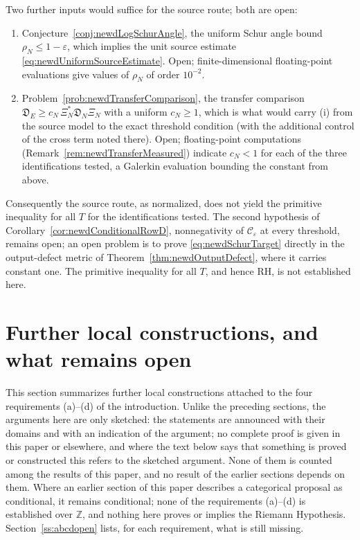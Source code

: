 \documentclass[11pt]{amsart}
\theoremstyle{definition}
\theoremstyle{remark}
\newcommand{\Z}{\mathbb Z}
\begin{document}
\begin{center}
{{Two further inputs would suffice for the source route; both are open:
\begin{enumerate}
\item[(i)] Conjecture~\ref{conj:newdLogSchurAngle}, the uniform Schur angle
bound $\rho_N\le1-\varepsilon$, which implies the unit source estimate
\eqref{eq:newdUniformSourceEstimate}.  Open; finite-dimensional
floating-point evaluations give values of $\rho_N$ of order $10^{-2}$.
\item[(ii)] Problem~\ref{prob:newdTransferComparison}, the transfer
comparison $\mathfrak D_E\ge c_N\,\Xi_N^*\mathfrak D_N\Xi_N$ with a uniform
$c_N\ge1$, which is what would carry (i) from the source model to the exact
threshold condition (with the additional control of the cross term noted
there).  Open; floating-point computations
(Remark~\ref{rem:newdTransferMeasured}) indicate $c_N<1$ for each of the
three identifications tested, a Galerkin evaluation bounding the constant
from above.
\end{enumerate}
Consequently the source route, as normalized, does not yield the primitive
inequality for all $T$ for the identifications tested.  The second hypothesis
of Corollary~\ref{cor:newdConditionalRowD}, nonnegativity of
$\mathcal C_\varepsilon$ at every threshold, remains open; an open problem is
to prove \eqref{eq:newdSchurTarget} directly in the output-defect metric of
Theorem~\ref{thm:newdOutputDefect}, where it carries constant one.  The
primitive inequality for all $T$, and hence RH, is not established here.
}}
\end{center}

\section{Further local constructions, and what remains open}
\label{sec:abcd-current}

This section summarizes further local constructions attached to the four
requirements (a)--(d) of the introduction. Unlike the preceding sections,
the arguments here are only sketched: the statements are announced with
their domains and with an indication of the argument; no complete proof is
given in this paper or elsewhere, and where the text below says that
something is proved or constructed this refers to the sketched argument.
None of them is counted among the results of this paper, and no result of
the earlier sections depends on them. Where an earlier section of this paper
describes a categorical proposal as conditional, it remains conditional;
none of the requirements (a)--(d) is established over $\Z$, and nothing
here proves or implies the Riemann Hypothesis. Section~\ref{ss:abcdopen}
lists, for each requirement, what is still missing.
\end{document}
